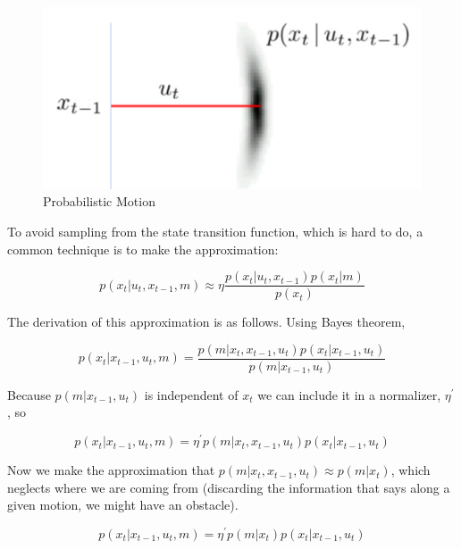 \documentclass[twoside]{article}
\begin{document}
\begin{figure}[H]
\centering
\includegraphics[width=.5\linewidth]{ProbabilisticMotion.png}
\caption{Probabilistic Motion}
\label{fig:ProbabilisticMotion}
\end{figure}

To avoid sampling from the state transition function, which is hard to do, a common technique is to make the approximation:

\begin{equation}
p \left( x _ { t } | u _ { t } , x _ { t - 1 } , m \right) \approx \eta \frac { p \left( x _ { t } | u _ { t } , x _ { t - 1 } \right) p \left( x _ { t } | m \right) } { p \left( x _ { t } \right) }
\end{equation}

The derivation of this approximation is as follows. Using Bayes theorem,

\begin{equation}
    p \left( x _ { t } | x _ { t - 1 } , u _ { t } , m \right) = \frac { p ( m | x _ { t } , x _ { t - 1 } , u _ { t } ) p \left( x _ { t } | x _ { t - 1 } , u _ { t } \right) } { p ( m | x _ { t - 1 } , u _ { t } ) }
\end{equation}

Because $p(m|x_{t-1}, u_t)$ is independent of $x_t$ we can include it in a normalizer, $\eta ^ \prime$, so

\begin{equation}
p \left( x _ { t } | x _ { t - 1 } , u _ { t } , m \right) = \eta ^ { \prime } p ( m | x _ { t } , x _ { t - 1 } , u _ { t } ) p \left( x _ { t } | x _ { t - 1 } , u _ { t } \right)
\end{equation}

Now we make the approximation that $p(m|x_t, x_{t-1}, u_t) \approx p(m|x_t)$, which neglects where we are coming from (discarding the information that says along a given motion, we might have an obstacle).

\begin{equation}
    p \left( x _ { t } | x _ { t - 1 } , u _ { t } , m \right) = \eta ^ { \prime } p ( m | x _ { t } ) p \left( x _ { t } | x _ { t - 1 } , u _ { t } \right)
\end{equation}
\end{document}
